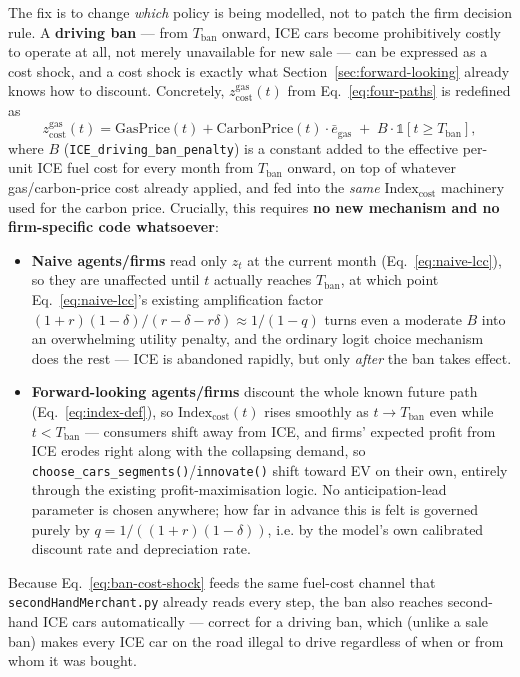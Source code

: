 \documentclass[11pt]{article}
\newcommand{\code}[1]{\texttt{#1}}
\begin{document}
The fix is to change \emph{which} policy is being modelled, not to patch
the firm decision rule. A \textbf{driving ban} --- from $T_{\mathrm{ban}}$
onward, ICE cars become prohibitively costly to operate at all, not merely
unavailable for new sale --- can be expressed as a cost shock, and a cost
shock is exactly what Section~\ref{sec:forward-looking} already knows how
to discount. Concretely, $z^{\mathrm{gas}}_{\mathrm{cost}}(t)$ from
Eq.~\eqref{eq:four-paths} is redefined as
\begin{equation}
  z^{\mathrm{gas}}_{\mathrm{cost}}(t)
  = \mathrm{GasPrice}(t) + \mathrm{CarbonPrice}(t)\cdot \bar e_{\mathrm{gas}}
    \;+\; B \cdot \mathbb{1}[t \ge T_{\mathrm{ban}}],
  \label{eq:ban-cost-shock}
\end{equation}
where $B$ (\code{ICE\_driving\_ban\_penalty}) is a constant added to the
effective per-unit ICE fuel cost for every month from $T_{\mathrm{ban}}$
onward, on top of whatever gas/carbon-price cost already applied, and fed
into the \emph{same} $\mathrm{Index}_{\mathrm{cost}}$ machinery used for the
carbon price. Crucially, this requires \textbf{no new mechanism and no
firm-specific code whatsoever}:
\begin{itemize}
  \item \textbf{Naive agents/firms} read only $z_t$ at the current month
    (Eq.~\eqref{eq:naive-lcc}), so they are unaffected until $t$ actually
    reaches $T_{\mathrm{ban}}$, at which point Eq.~\eqref{eq:naive-lcc}'s
    existing amplification factor $(1+r)(1-\delta)/(r-\delta-r\delta)
    \approx 1/(1-q)$ turns even a moderate $B$ into an overwhelming utility
    penalty, and the ordinary logit choice mechanism does the rest --- ICE
    is abandoned rapidly, but only \emph{after} the ban takes effect.
  \item \textbf{Forward-looking agents/firms} discount the whole known
    future path (Eq.~\eqref{eq:index-def}), so $\mathrm{Index}_{\mathrm{cost}}(t)$
    rises smoothly as $t\to T_{\mathrm{ban}}$ even while $t < T_{\mathrm{ban}}$
    --- consumers shift away from ICE, and firms' expected profit from ICE
    erodes right along with the collapsing demand, so
    \code{choose\_cars\_segments()}/\code{innovate()} shift toward EV on
    their own, entirely through the existing profit-maximisation logic. No
    anticipation-lead parameter is chosen anywhere; how far in advance this
    is felt is governed purely by $q=1/((1+r)(1-\delta))$, i.e. by the
    model's own calibrated discount rate and depreciation rate.
\end{itemize}
Because Eq.~\eqref{eq:ban-cost-shock} feeds the same fuel-cost channel that
\code{secondHandMerchant.py} already reads every step, the ban also reaches
second-hand ICE cars automatically --- correct for a driving ban, which
(unlike a sale ban) makes every ICE car on the road illegal to drive
regardless of when or from whom it was bought.
\end{document}
